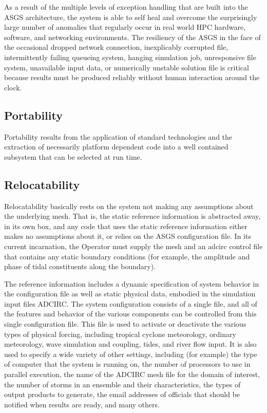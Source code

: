 \documentclass[jmse,article,submit,moreauthors,pdftex,12pt,a4paper]{mdpi}
\begin{document}
As a result of the multiple levels of exception handling that are 
built into the ASGS architecture, the system is able to self heal 
and overcome the surprisingly large number of anomalies that 
regularly occur in real world HPC hardware, software, and networking 
environments. The resiliency of the ASGS in the face of the 
occasional dropped network connection, inexplicably corrupted file, 
intermittently failing queueing system, hanging simulation job, 
unresponsive file system, unavailable input data, or numerically 
unstable solution file is critical because results must be produced 
reliably without human interaction around the clock. 

\subsection{Portability}

Portability results from the application of standard technologies and
the extraction of necessarily platform dependent code into a well 
contained subsystem that can be selected at run time. 


\subsection{Relocatability}

Relocatability basically rests on the system not making any 
assumptions about the underlying mesh. That is, the static reference 
information is abstracted away, in its own box, and any code that 
uses the static reference information either makes no assumptions 
about it, or relies on the ASGS configuration file. In its current 
incarnation, the Operator must supply the mesh and an adcirc control 
file that contains any static boundary conditions (for example, the 
amplitude and phase of tidal constituents along the boundary). 

The reference information includes a dynamic specification of system 
behavior in the configuration file as well as static physical data, 
embodied in the simulation input files ADCIRC. The system 
configuration consists of a single file, and all of the features and 
behavior of the various components can be controlled from this 
single configuration file. This file is used to activate or 
deactivate the various types of physical forcing, including tropical 
cyclone meteorology, ordinary meteorology, wave simulation and 
coupling, tides, and river flow input. It is also used to specify a 
wide variety of other settings, including (for example) the type of 
computer that the system is running on, the number of processors to 
use in parallel execution, the name of the ADCIRC mesh file for the 
domain of interest, the number of storms in an ensemble and their 
characteristics, the types of output products to generate, the email 
addresses of officials that should be notified when results are 
ready, and many others. 
\end{document}
